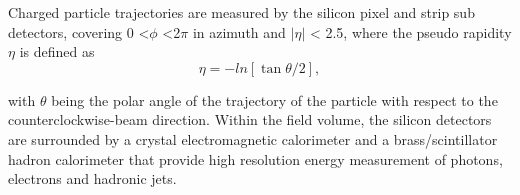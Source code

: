
 Charged particle trajectories are measured by the silicon pixel and strip sub detectors\cite{Palichik:2018wwn}, covering 0 <$\phi$ <2$\pi$ in azimuth and $|\eta|$ < 2.5, where the pseudo rapidity $\eta$ is defined as 
 \begin{equation*}
     \eta = -ln[\tan \theta/2],
 \end{equation*}
 
 with $\theta$ being the polar angle of the trajectory of the particle with respect to the counterclockwise-beam direction. Within the field
volume, the silicon detectors are surrounded by a crystal electromagnetic calorimeter and a brass/scintillator hadron calorimeter that provide high resolution energy measurement of photons, electrons and hadronic jets.




